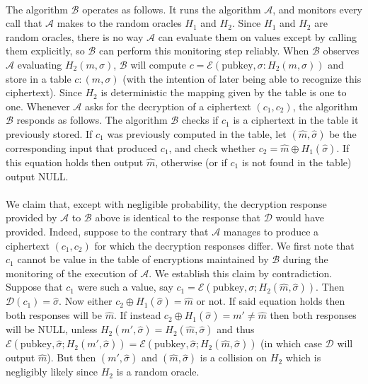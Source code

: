\documentclass[letterpaper,12pt,oneside,onecolumn]{report}
\begin{document}
\paragraph{}
The algorithm $\mathcal{B}$ operates as follows. It runs the algorithm $\mathcal{A}$, and monitors every call that $\mathcal{A}$ makes to the random oracles $H_1$ and $H_2$. Since $H_1$ and $H_2$ are random oracles, there is no way $\mathcal{A}$ can evaluate them on values except by calling them explicitly, so $\mathcal{B}$ can perform this monitoring step reliably. When $\mathcal{B}$ observes $\mathcal{A}$ evaluating $H_2(m,\sigma)$, $\mathcal{B}$ will compute $c = \mathcal{E}(\text{pubkey}, \sigma:H_2(m,\sigma))$ and store in a table $c : (m,\sigma)$ (with the intention of later being able to recognize this ciphertext). Since $H_2$ is deterministic the mapping given by the table is one to one. Whenever $\mathcal{A}$ asks for the decryption of a ciphertext $(c_1,c_2)$, the algorithm $\mathcal{B}$ responds as follows. The algorithm $\mathcal{B}$ checks if $c_1$ is a ciphertext in the table it previously stored. If $c_1$ was previously computed in the table, let $(\hat{m}, \hat{\sigma})$ be the corresponding input that produced $c_1$, and check whether $c_2 = \hat{m} \oplus H_1(\hat{\sigma})$. If this equation holds then output $\hat{m}$, otherwise (or if $c_1$ is not found in the table) output NULL. 
\paragraph{}
We claim that, except with negligible probability, the decryption response provided by $\mathcal{A}$ to $\mathcal{B}$ above is identical to the response that $\mathcal{D}$ would have provided. Indeed, suppose to the contrary that $\mathcal{A}$ manages to produce a ciphertext $(c_1,c_2)$ for which the decryption responses differ. We first note that $c_1$ cannot be value in the table of encryptions maintained by $\mathcal{B}$ during the monitoring of the execution of $\mathcal{A}$. We establish this claim by contradiction. Suppose that $c_1$ were such a value, say $c_1 = \mathcal{E}(\text{pubkey}, \sigma; H_2(\hat{m}, \hat{\sigma}))$. Then $\mathcal{D}(c_1) = \hat{\sigma}$. Now either $c_2 \oplus H_1(\hat{\sigma}) = \hat{m}$ or not.  If said equation holds then both responses will be $\hat{m}$. If instead $c_2 \oplus H_1(\hat{\sigma}) = m' \neq \hat{m}$ then both responses will be NULL, unless $H_2(m', \hat{\sigma}) = H_2(\hat{m}, \hat{\sigma})$ and thus $\mathcal{E}(\text{pubkey},\hat{\sigma}; H_2(m', \hat{\sigma})) =\mathcal{E}(\text{pubkey},\hat{\sigma}; H_2(\hat{m}, \hat{\sigma}))$ (in which case $\mathcal{D}$ will output $\hat{m}$). But then $(m', \hat{\sigma})$ and $(\hat{m}, \hat{\sigma})$ is a collision on $H_2$ which is negligibly likely since $H_2$ is a random oracle.
\end{document}
